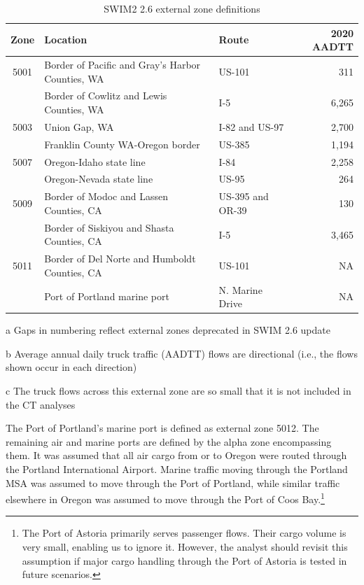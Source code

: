 \begin{table}
\centering
\caption{SWIM2 2.6 external zone definitions}
\label{tab:swim2-external-zones}
\begin{threeparttable}
\begin{tabular}{cllr}
\hline
Zone\tnote{a} & Location & Route & 2020 AADTT\tnote{b} \\
\hline
5001 & Border of Pacific and Gray's Harbor Counties, WA & US-101 & 311 \\
\gray 5002 & Border of Cowlitz and Lewis Counties, WA & I-5 & 6,265 \\
5003 & Union Gap, WA & I-82 and US-97 & 2,700 \\
\gray 5004 & Franklin County WA-Oregon border & US-385 & 1,194 \\
5007 & Oregon-Idaho state line & I-84 & 2,258 \\
\gray 5008 & Oregon-Nevada state line & US-95 & 264 \\
5009 & Border of Modoc and Lassen Counties, CA & US-395 and OR-39 & 130 \\
\gray 5010 & Border of Siskiyou and Shasta Counties, CA & I-5 & 3,465 \\
5011 & Border of Del Norte and Humboldt Counties, CA & US-101 & NA\tnote{c} \\
\gray 5012 & Port of Portland marine port & N. Marine Drive & NA \\
\hline
\end{tabular}
\begin{tablenotes}
\footnotesize
\item[a] Gaps in numbering reflect external zones deprecated in SWIM 2.6 update
\item[b] Average annual daily truck traffic (AADTT) flows are directional (i.e., the flows shown occur in each direction)
\item[c] The truck flows across this external zone are so small that it is not included in the CT analyses
\end{tablenotes}
\end{threeparttable}
\end{table}

The Port of Portland's marine port is defined as external zone 5012. The remaining air and marine ports are defined by the alpha zone encompassing them. It was assumed that all air cargo from or to Oregon were routed through the Portland International Airport. Marine traffic moving through the Portland MSA was assumed to move through the Port of Portland, while similar traffic elsewhere in Oregon was assumed to move through the Port of Coos Bay.\footnote{The Port of Astoria primarily serves passenger flows. Their cargo volume is very small, enabling us to ignore it. However, the analyst should revisit this assumption if major cargo handling through the Port of Astoria is tested in future scenarios.} 

